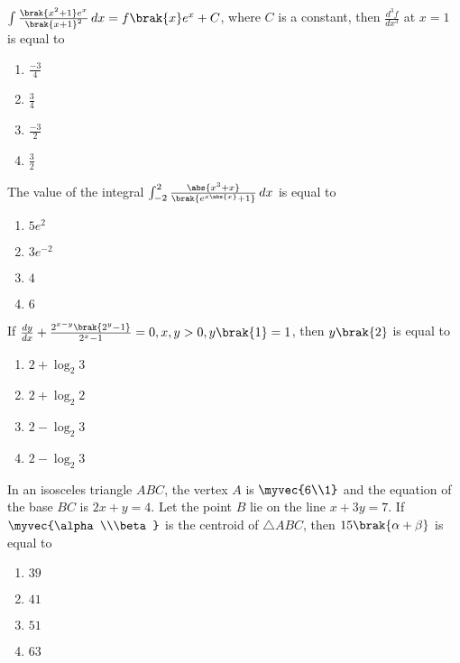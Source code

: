     \item $\int \frac{\brak{x^2 + 1}e^x}{\brak{x+1}^2} \, dx = f\brak{x}e^x + C$, where $C$ is a constant, then $\frac{d^3f}{dx^3}$ at $x = 1$ is equal to
    \hfill{}

	\begin{enumerate}
		\item $\frac{-3}{4}$
		\item $\frac{3}{4}$
		\item $\frac{-3}{2}$
		\item $\frac{3}{2}$
	\end{enumerate}

    \item The value of the integral $\int_{-2}^{2} \frac{\abs{x^3 + x}}{\brak{e^{x\abs{x}} + 1}} \, dx$ is equal to
    \hfill{}

	\begin{enumerate}
		\item $5e^2$ 
		\item $3e^{-2}$
		\item $4$
		\item $6$
	\end{enumerate}

    \item If $\frac{dy}{dx} + \frac{2^{x - y}\brak{2^y - 1}}{2^x - 1} = 0, x,y > 0, y\brak{1} = 1$, then $y\brak{2}$ is equal to
    \hfill{}

	\begin{enumerate}
		\item $2 + \log_{2} 3$ 
		\item $2 + \log_{2} 2$ 
		\item $2 - \log_{2} 3$ 
		\item $2 - \log_{2} 3$ 
	\end{enumerate}

    \item In an isosceles triangle $ABC$, the vertex $A$ is $\myvec{6\\1}$ and the equation of the base $BC$ is $2x + y = 4$. Let the point $B$ lie on the line $x + 3y = 7$. If $\myvec{\alpha\\\beta}$ is the centroid of $\triangle ABC$, then $15\brak{\alpha + \beta}$ is equal to
    \hfill{}

	\begin{enumerate}
		\item $39$ 
		\item $41$
		\item $51$
		\item $63$
	\end{enumerate}

